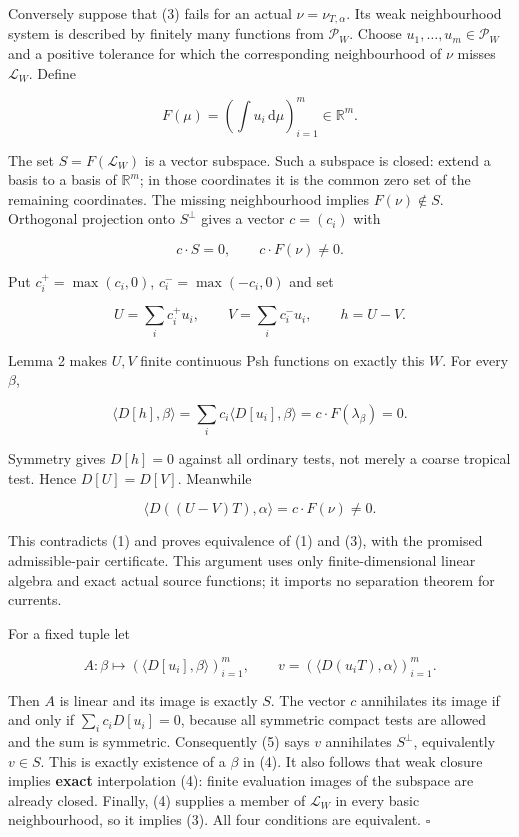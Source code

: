 \documentclass[
  11pt,
]{article}
\begin{document}
Conversely suppose that (3) fails for an actual \(\nu=\nu_{T,\alpha}\).
Its weak neighbourhood system is described by finitely many functions
from \(\mathcal P_W\). Choose \(u_1,\ldots,u_m\in\mathcal P_W\) and a
positive tolerance for which the corresponding neighbourhood of \(\nu\)
misses \(\mathscr L_W\). Define

\[F(\mu)=\left(\int u_i\,\mathrm d\mu\right)_{i=1}^m\in\mathbb R^m.\]

The set \(S=F(\mathscr L_W)\) is a vector subspace. Such a subspace is
closed: extend a basis to a basis of \(\mathbb R^m\); in those
coordinates it is the common zero set of the remaining coordinates. The
missing neighbourhood implies \(F(\nu)\notin S\). Orthogonal projection
onto \(S^\perp\) gives a vector \(c=(c_i)\) with

\[c\cdot S=0,\qquad c\cdot F(\nu)\ne0.\]

Put \(c_i^+=\max(c_i,0)\), \(c_i^-=\max(-c_i,0)\) and set

\[
U=\sum_i c_i^+u_i,\qquad V=\sum_i c_i^-u_i,\qquad h=U-V. \tag{7}
\]

Lemma 2 makes \(U,V\) finite continuous Psh functions on exactly this
\(W\). For every \(\beta\),

\[\langle D[h],\beta\rangle=\sum_i c_i\langle D[u_i],\beta\rangle=c\cdot F(\lambda_\beta)=0.\]

Symmetry gives \(D[h]=0\) against all ordinary tests, not merely a
coarse tropical test. Hence \(D[U]=D[V]\). Meanwhile

\[\langle D((U-V)T),\alpha\rangle=c\cdot F(\nu)\ne0.\]

This contradicts (1) and proves equivalence of (1) and (3), with the
promised admissible-pair certificate. This argument uses only
finite-dimensional linear algebra and exact actual source functions; it
imports no separation theorem for currents.

For a fixed tuple let

\[A:\beta\longmapsto(\langle D[u_i],\beta\rangle)_{i=1}^m,\qquad
v=(\langle D(u_iT),\alpha\rangle)_{i=1}^m.\]

Then \(A\) is linear and its image is exactly \(S\). The vector \(c\)
annihilates its image if and only if \(\sum_i c_iD[u_i]=0\), because all
symmetric compact tests are allowed and the sum is symmetric.
Consequently (5) says \(v\) annihilates \(S^\perp\), equivalently
\(v\in S\). This is exactly existence of a \(\beta\) in (4). It also
follows that weak closure implies \textbf{exact} interpolation (4):
finite evaluation images of the subspace are already closed. Finally,
(4) supplies a member of \(\mathscr L_W\) in every basic neighbourhood,
so it implies (3). All four conditions are equivalent. \(\square\)
\end{document}

